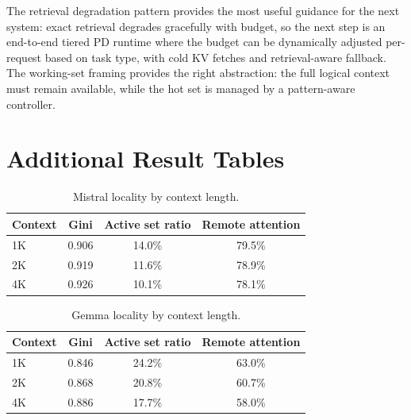 \documentclass[11pt]{article}
\newcommand{\pct}{\%}
\theoremstyle{definition}
\theoremstyle{plain}
\begin{document}
The retrieval degradation pattern provides the most useful guidance for the next system: exact retrieval degrades gracefully with budget, so the next step is an end-to-end tiered PD runtime where the budget can be dynamically adjusted per-request based on task type, with cold KV fetches and retrieval-aware fallback.  The working-set framing provides the right abstraction: the full logical context must remain available, while the hot set is managed by a pattern-aware controller.

\appendix

\section{Additional Result Tables}
\label{app:tables}

\begin{table}[h]
\centering
\caption{Mistral locality by context length.}
\small
\begin{tabular}{lccc}
\toprule
Context & Gini & Active set ratio & Remote attention \\
\midrule
1K & 0.906 & 14.0\pct{} & 79.5\pct{} \\
2K & 0.919 & 11.6\pct{} & 78.9\pct{} \\
4K & 0.926 & 10.1\pct{} & 78.1\pct{} \\
\bottomrule
\end{tabular}
\end{table}

\begin{table}[h]
\centering
\caption{Gemma locality by context length.}
\small
\begin{tabular}{lccc}
\toprule
Context & Gini & Active set ratio & Remote attention \\
\midrule
1K & 0.846 & 24.2\pct{} & 63.0\pct{} \\
2K & 0.868 & 20.8\pct{} & 60.7\pct{} \\
4K & 0.886 & 17.7\pct{} & 58.0\pct{} \\
\bottomrule
\end{tabular}
\end{table}



\end{document}
